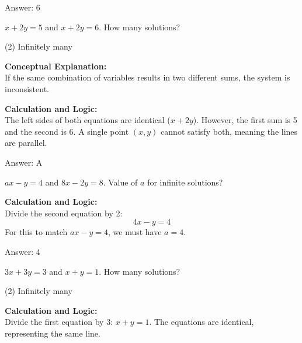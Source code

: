\documentclass[11pt,paper=a4,answers]{exam}
\begin{document}
\begin{questions}
\begin{solution}
\vspace{15pt}
Answer: \colorbox{yellow!100}{6}
\end{solution}

\question
$x + 2y = 5$ and $x + 2y = 6$. How many solutions?
\begin{tasks}(2)
    \task Infinitely many
\end{tasks}

\begin{solution}
\textbf{Conceptual Explanation:} \\
If the same combination of variables results in two different sums, the system is inconsistent.

\vspace{10pt}
\textbf{Calculation and Logic:} \\
The left sides of both equations are identical ($x + 2y$). However, the first sum is 5 and the second is 6. A single point $(x, y)$ cannot satisfy both, meaning the lines are parallel.

\vspace{15pt}
Answer: \colorbox{yellow!100}{A}
\end{solution}

\question
$ax - y = 4$ and $8x - 2y = 8$. Value of $a$ for infinite solutions?

\begin{solution}
\textbf{Calculation and Logic:} \\
Divide the second equation by 2:
\[ 4x - y = 4 \]
For this to match $ax - y = 4$, we must have $a = 4$.

\vspace{15pt}
Answer: \colorbox{yellow!100}{4}
\end{solution}

\question
$3x + 3y = 3$ and $x + y = 1$. How many solutions?
\begin{tasks}(2)
    \task Infinitely many
\end{tasks}

\begin{solution}
\textbf{Calculation and Logic:} \\
Divide the first equation by 3: $x + y = 1$.
The equations are identical, representing the same line.


\end{solution}
\end{questions}
\end{document}
